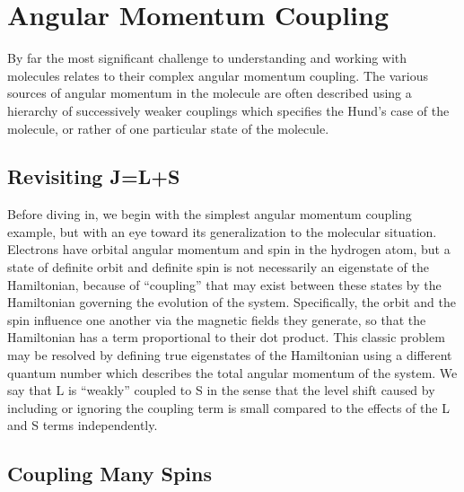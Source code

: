 \section{Angular Momentum Coupling}

By far the most significant challenge to understanding and working with molecules relates to their complex angular momentum coupling. 
The various sources of angular momentum in the molecule are often described using a hierarchy of successively weaker couplings which specifies the Hund's case of the molecule, or rather of one particular state of the molecule.


\subsection{Revisiting J=L+S}

Before diving in, we begin with the simplest angular momentum coupling example, but with an eye toward its generalization to the molecular situation.
Electrons have orbital angular momentum and spin in the hydrogen atom, but a state of definite orbit and definite spin is not necessarily an eigenstate of the Hamiltonian, because of ``coupling'' that may exist between these states by the Hamiltonian governing the evolution of the system.
Specifically, the orbit and the spin influence one another via the magnetic fields they generate, so that the Hamiltonian has a term proportional to their dot product.
This classic problem may be resolved by defining true eigenstates of the Hamiltonian using a different quantum number which describes the total angular momentum of the system.
We say that L is ``weakly'' coupled to S in the sense that the level shift caused by including or ignoring the coupling term is small compared to the effects of the L and S terms independently.

\subsection{Coupling Many Spins}

